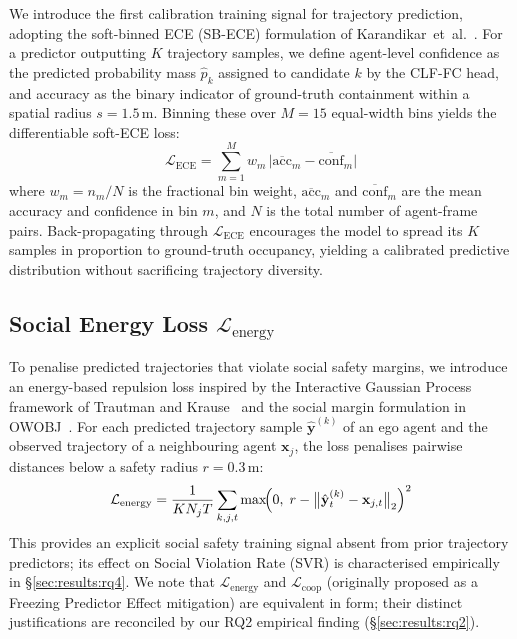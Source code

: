\documentclass{article}
\makeatletter
\newcommand{\etal}{et~al.\@}                 %
\makeatother
\begin{document}
We introduce the first calibration training signal for trajectory prediction,
adopting the soft-binned ECE (SB-ECE) formulation of
Karandikar~\etal~\cite{karandikar2021soft}. For a predictor outputting \(K\)
trajectory samples, we define agent-level confidence as the predicted
probability mass \(\hat{p}_k\) assigned to candidate \(k\) by the CLF-FC
head, and accuracy as the binary indicator of ground-truth containment within
a spatial radius \(s = 1.5\)\,m. Binning these over \(M = 15\) equal-width
bins yields the differentiable soft-ECE loss:
%
\begin{equation}
  \mathcal{L}_{\text{ECE}} = \sum_{m=1}^{M} w_m \,
  \bigl| \overline{\text{acc}}_m - \overline{\text{conf}}_m \bigr|
  \label{eq:lece}
\end{equation}
%
where \(w_m = n_m / N\) is the fractional bin weight,
\(\overline{\text{acc}}_m\) and \(\overline{\text{conf}}_m\) are the mean
accuracy and confidence in bin \(m\), and \(N\) is the total number of
agent-frame pairs. Back-propagating through \(\mathcal{L}_{\text{ECE}}\)
encourages the model to spread its \(K\) samples in proportion to
ground-truth occupancy, yielding a calibrated predictive distribution without
sacrificing trajectory diversity.

\subsection{Social Energy Loss \(\mathcal{L}_{\text{energy}}\)}
\label{sec:method:energy}

To penalise predicted trajectories that violate social safety margins, we
introduce an energy-based repulsion loss inspired by the Interactive Gaussian
Process framework of Trautman and Krause~\cite{trautman2010unfreezing} and the
social margin formulation in OWOBJ~\cite{zhang2025openworld}. For each
predicted trajectory sample \(\hat{\mathbf{y}}^{(k)}\) of an ego agent and
the observed trajectory of a neighbouring agent \(\mathbf{x}_j\), the loss
penalises pairwise distances below a safety radius \(r = 0.3\)\,m:
%
\begin{equation}
  \mathcal{L}_{\text{energy}} = \frac{1}{KN_j T}
  \sum_{k,j,t} \max\!\Bigl(0,\;
  r - \bigl\|\hat{\mathbf{y}}^{(k)}_t - \mathbf{x}_{j,t}\bigr\|_2\Bigr)^2
  \label{eq:lenergy}
\end{equation}
%
This provides an explicit social safety training signal absent from prior
trajectory predictors; its effect on Social Violation Rate (SVR) is
characterised empirically in \S\ref{sec:results:rq4}.
We note that \(\mathcal{L}_{\text{energy}}\) and \(\mathcal{L}_{\text{coop}}\)
(originally proposed as a Freezing Predictor Effect mitigation) are equivalent
in form; their distinct justifications are reconciled by our RQ2 empirical
finding (\S\ref{sec:results:rq2}).
\end{document}
